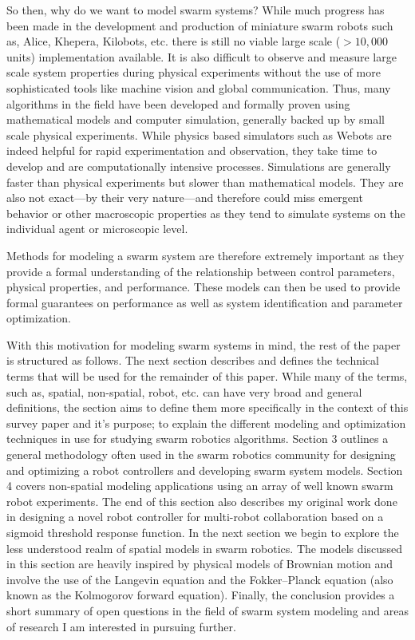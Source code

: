 \documentclass[Main.tex]{subfiles}
\begin{document}
So then, why do we want to model swarm systems? While much progress has been made in the development and production of miniature swarm robots such as, Alice, Khepera, Kilobots, etc.\cite{Dorigo2005,Seyfried2005,Mondada2009,Caprari1998,Rubenstein2012} there is still no viable large scale ($> 10,000$ units) implementation available. It is also difficult to observe and measure large scale system properties during physical experiments without the use of more sophisticated tools like machine vision and global communication. Thus, many algorithms in the field have been developed and formally proven using mathematical models and computer simulation, generally backed up by small scale physical experiments. While physics based simulators such as Webots\cite{Michel1998} are indeed helpful for rapid experimentation and observation, they take time to develop and are computationally intensive processes. Simulations are generally faster than physical experiments but slower than mathematical models. They are also not exact---by their very nature---and therefore could miss emergent behavior or other macroscopic properties as they tend to simulate systems on the individual agent or microscopic level. 

Methods for modeling a swarm system are therefore extremely important as they provide a formal understanding of the relationship between control parameters, physical properties, and performance. These models can then be used to provide formal guarantees on performance as well as system identification and parameter optimization\cite{Correll2006a,Correll2008}.

With this motivation for modeling swarm systems in mind, the rest of the paper is structured as follows. The next section describes and defines the technical terms that will be used for the remainder of this paper. While many of the terms, such as, spatial, non-spatial, robot, etc. can have very broad and general definitions, the section aims to define them more specifically in the context of this survey paper and it's purpose; to explain the different modeling and optimization techniques in use for studying swarm robotics algorithms. Section 3 outlines a general methodology often used in the swarm robotics community for designing and optimizing a robot controllers and developing swarm system models. Section 4 covers non-spatial modeling applications using an array of well known swarm robot experiments. The end of this section also describes my original work done in designing a novel robot controller for multi-robot collaboration based on a sigmoid threshold response function. In the next section we begin to explore the less understood realm of spatial models in swarm robotics. The models discussed in this section are heavily inspired by physical models of Brownian motion and involve the use of the Langevin equation and the Fokker--Planck equation (also known as the Kolmogorov forward equation). Finally, the conclusion provides a short summary of open questions in the field of swarm system modeling and areas of research I am interested in pursuing further.
\end{document}
